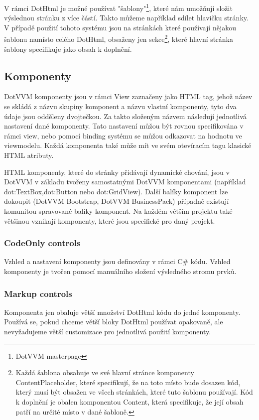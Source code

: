     V rámci DotHtml je možné používat "šablony"\footnote{DotVVM masterpage}, které nám umožňuji složit výslednou stránku z více částí. Takto můžeme například sdílet hlavičku stránky. V případě použití tohoto systému jsou na stránkách které používají nějakou šablonu namísto celého DotHtml, obsaženy jen sekce\footnote{Každá šablona obsahuje ve své hlavní stránce komponenty ContentPlaceholder, které specifikují, že na toto místo bude dosazen kód, který musí být obsažen ve všech stránkách, které tuto šablonu používají. Kód k doplnění je obalen komponentou Content, která specifikuje, že její obsah patří na určité místo v dané šabloně.}, které hlavní stránka šablony specifikuje jako obsah k doplnění.

\subsection*{Komponenty}
DotVVM komponenty jsou v rámci View zaznačeny jako HTML tag, jehož název se skládá z názvu skupiny komponent a názvu vlastní komponenty, tyto dva údaje jsou odděleny dvojtečkou. Za takto složeným názvem následují jednotlivá nastavení dané komponenty. Tato nastavení můžou být rovnou specifikována v rámci view, nebo pomocí binding systému se můžou odkazovat na hodnotu ve viewmodelu. Každá komponenta také může mít ve svém otevíracím tagu klasické HTML atributy. 

HTML komponenty, které do stránky přidávají dynamické chování, jsou v DotVVM v základu tvořeny samostatnými DotVVM komponentami (například dot:TextBox,dot:Button nebo dot:GridView). Další balíky komponent lze dokoupit (DotVVM Bootstrap, DotVVM BusinessPack) případně existují komunitou spravované balíky komponent. Na každém větším projektu také většinou vznikají komponenty, které jsou specifické pro daný projekt.

\subsubsection{CodeOnly controls}
Vzhled a nastavení komponenty jsou definovány v rámci C\# kódu.\newline
Vzhled komponenty je tvořen pomocí manuálního složení výsledného stromu prvků.

\subsubsection{Markup controls}
 Komponenta jen obaluje větší množství DotHtml kódu do jedné komponenty.\newline
 Používá se, pokud chceme větší bloky DotHtml používat opakovaně, ale nevyžadujeme větší customizace pro jednotlivá použití komponenty.
 
